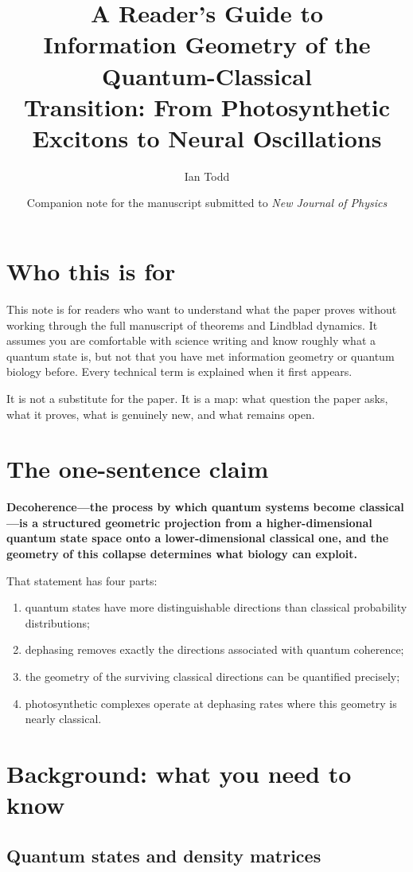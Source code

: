 \documentclass[11pt,a4paper]{article}
\title{\textbf{A Reader's Guide to\\Information Geometry of the Quantum-Classical\\Transition: From Photosynthetic Excitons to Neural Oscillations}}
\author{Ian Todd}
\date{Companion note for the manuscript submitted to \emph{New Journal of Physics}}
\begin{document}
\maketitle

\section*{Who this is for}

This note is for readers who want to understand what the paper proves without working through the full manuscript of theorems and Lindblad dynamics.  It assumes you are comfortable with science writing and know roughly what a quantum state is, but not that you have met information geometry or quantum biology before.  Every technical term is explained when it first appears.

It is not a substitute for the paper.  It is a map: what question the paper asks, what it proves, what is genuinely new, and what remains open.

\section*{The one-sentence claim}

\textbf{Decoherence---the process by which quantum systems become classical---is a structured geometric projection from a higher-dimensional quantum state space onto a lower-dimensional classical one, and the geometry of this collapse determines what biology can exploit.}

That statement has four parts:
\begin{enumerate}[leftmargin=1.5em]
\item quantum states have more distinguishable directions than classical probability distributions;
\item dephasing removes exactly the directions associated with quantum coherence;
\item the geometry of the surviving classical directions can be quantified precisely;
\item photosynthetic complexes operate at dephasing rates where this geometry is nearly classical.
\end{enumerate}

\section*{Background: what you need to know}

\subsection*{Quantum states and density matrices}
\end{document}
